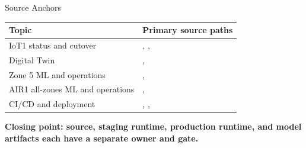 \documentclass[aspectratio=169]{beamer}
\newcommand{\pathref}[1]{{\scriptsize\ttfamily\detokenize{#1}}}
\newcommand{\tightsep}{\vspace{0.35em}}
\begin{document}
\begin{frame}{Source Anchors}
\scriptsize
\begin{tabularx}{\textwidth}{@{}lX@{}}
\toprule
\textbf{Topic} & \textbf{Primary source paths} \\
\midrule
IoT1 status and cutover & \pathref{docs/STATUS.md}, \pathref{docs/IOT1_PRE_DEPLOYMENT.md}, \pathref{docs/IOT1_REMEDIATION.md} \\
Digital Twin & \pathref{Smart-iLab_DigitalTwin/}, \pathref{README.md} \\
Zone 5 ML and operations & \pathref{zone5_cv_time_features_package/PIPELINE.md}, \pathref{zone5/.../feature_contract.py} \\
AIR1 all-zones ML and operations & \pathref{air1_all_zones_cv_time_features_package/PIPELINE.md}, \pathref{air1_all_zones/.../feature_contract.py} \\
CI/CD and deployment & \pathref{.github/workflows/}, \pathref{zone5/.../CICD_SYSTEMD.md}, \pathref{zone5/.../CICD_DOCKER_COMPOSE.md} \\
\bottomrule
\end{tabularx}
\tightsep
\begin{center}
\parbox{0.86\textwidth}{\centering\textbf{Closing point: source, staging runtime, production runtime, and model artifacts each have a separate owner and gate.}}
\end{center}
\end{frame}
\end{document}

